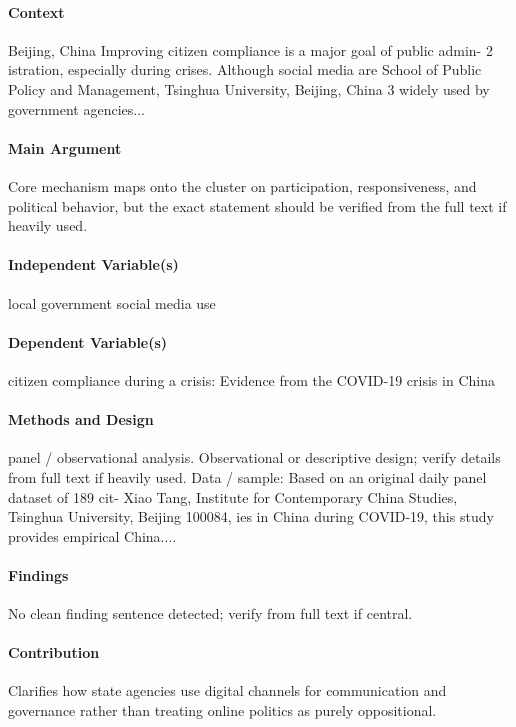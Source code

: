\documentclass[12pt]{article}
\begin{document}
\paragraph{Context} Beijing, China Improving citizen compliance is a major goal of public admin- 2 istration, especially during crises. Although social media are School of Public Policy and Management, Tsinghua University, Beijing, China 3 widely used by government agencies...

\paragraph{Main Argument} Core mechanism maps onto the cluster on participation, responsiveness, and political behavior, but the exact statement should be verified from the full text if heavily used.

\paragraph{Independent Variable(s)} local government social media use

\paragraph{Dependent Variable(s)} citizen compliance during a crisis: Evidence from the COVID-19 crisis in China

\paragraph{Methods and Design} panel / observational analysis. Observational or descriptive design; verify details from full text if heavily used. Data / sample: Based on an original daily panel dataset of 189 cit- Xiao Tang, Institute for Contemporary China Studies, Tsinghua University, Beijing 100084, ies in China during COVID-19, this study provides empirical China....

\paragraph{Findings} No clean finding sentence detected; verify from full text if central.

\paragraph{Contribution} Clarifies how state agencies use digital channels for communication and governance rather than treating online politics as purely oppositional.
\end{document}
